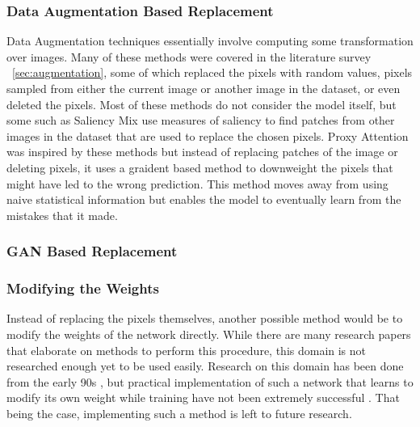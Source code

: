 \subsubsection{Data Augmentation Based Replacement}
Data Augmentation techniques essentially involve computing some transformation over images. Many of these methods were covered in the literature survey ~\ref{sec:augmentation}, some of which replaced the pixels with random values, pixels sampled from either the current image or another image in the dataset, or even deleted the pixels. Most of these methods do not consider the model itself, but some such as Saliency Mix \cite{uddinSaliencyMixSaliencyGuided2021} use measures of saliency to find patches from other images in the dataset that are used to replace the chosen pixels. 
Proxy Attention was inspired by these methods but instead of replacing patches of the image or deleting pixels, it uses a graident based method to downweight the pixels that might have led to the wrong prediction. This method moves away from using naive statistical information but enables the model to eventually learn from the mistakes that it made.

\subsubsection{GAN Based Replacement}


\subsubsection{Modifying the Weights}
Instead of replacing the pixels themselves, another possible method would be to modify the weights of the network directly. While there are many research papers that elaborate on methods to perform this procedure, this domain is not researched enough yet to be used easily. Research on this domain has been done from the early 90s \cite{schmidhuberSelfReferentialWeightMatrix1993}, but practical implementation of such a network that learns to modify its own weight while training have not been extremely successful \cite{irieModernSelfReferentialWeight2022}. 
That being the case, implementing such a method is left to future research. 


